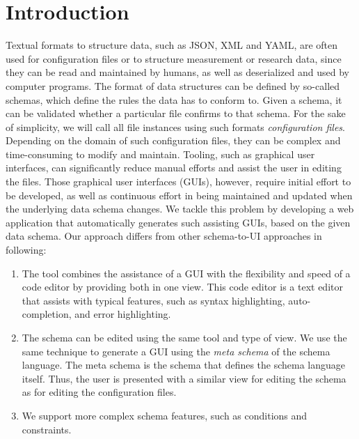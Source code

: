 \documentclass[lettersize,journal]{IEEEtran}
\newcommand{\cfgfiles}{configuration files}
\begin{document}
 \section{Introduction}\label{sec:introduction} %

 Textual formats to structure data, such as JSON, XML and YAML, are often used for configuration files or to structure measurement
 or research data, since they can be read and maintained by humans, as well as deserialized and used by computer programs.
 The format of data structures can be defined by so-called schemas, which define the rules the data has to conform to.
 Given a schema, it can be validated whether a particular file confirms to that schema.
 For the sake of simplicity, we will call all file instances using such formats \textit{\cfgfiles}.
 Depending on the domain of such \cfgfiles, they can be complex and time-consuming to modify and maintain.
 Tooling, such as graphical user interfaces, can significantly reduce manual efforts and assist the user in editing the files.
 Those graphical user interfaces (GUIs), however, require initial effort to be developed, as well as continuous effort in being maintained and updated when the underlying data schema changes.
 We tackle this problem by developing a web application that automatically generates such assisting GUIs, based on the given data schema.
 Our approach differs from other schema-to-UI approaches in following:

 \begin{enumerate}
  \item The tool combines the assistance of a GUI with the flexibility and speed of a code editor by providing both in one view.
  This code editor is a text editor that assists with typical features, such as syntax highlighting, auto-completion, and error highlighting.
  \item The schema can be edited using the same tool and type of view.
  We use the same technique to generate a GUI using the \textit{meta schema} of the schema language.
  The meta schema is the schema that defines the schema language itself.
  Thus, the user is presented with a similar view for editing the schema as for editing the \cfgfiles{}.
  \item We support more complex schema features, such as conditions and constraints.
 \end{enumerate}
\end{document}

